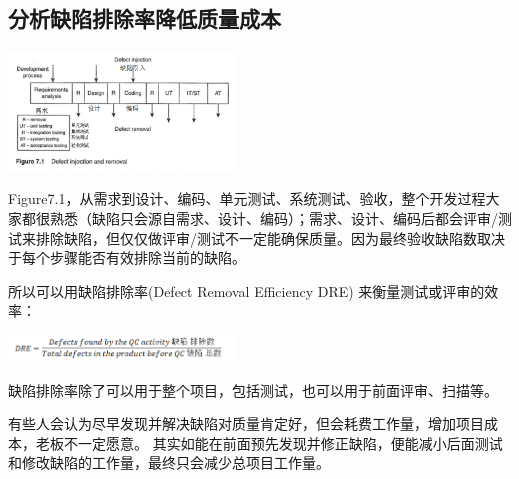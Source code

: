 
\hypertarget{ux5206ux6790ux7f3aux9677ux6392ux9664ux7387ux964dux4f4eux8d28ux91cfux6210ux672c}{%
\subsection{分析缺陷排除率降低质量成本}\label{ux5206ux6790ux7f3aux9677ux6392ux9664ux7387ux964dux4f4eux8d28ux91cfux6210ux672c}}


\includegraphics[width=6cm]{jalote_emm_71_10.png}

Figure7.1，从需求到设计、编码、单元测试、系统测试、验收，整个开发过程大家都很熟悉（缺陷只会源自需求、设计、编码）；需求、设计、编码后都会评审/测试来排除缺陷，但仅仅做评审/测试不一定能确保质量。因为最终验收缺陷数取决于每个步骤能否有效排除当前的缺陷。

所以可以用缺陷排除率(Defect Removal Efficiency DRE)
来衡量测试或评审的效率：


\includegraphics[width=6cm]{Ma3_10.png}

缺陷排除率除了可以用于整个项目，包括测试，也可以用于前面评审、扫描等。

有些人会认为尽早发现并解决缺陷对质量肯定好，但会耗费工作量，增加项目成本，老板不一定愿意。
其实如能在前面预先发现并修正缺陷，便能减小后面测试和修改缺陷的工作量，最终只会减少总项目工作量。


